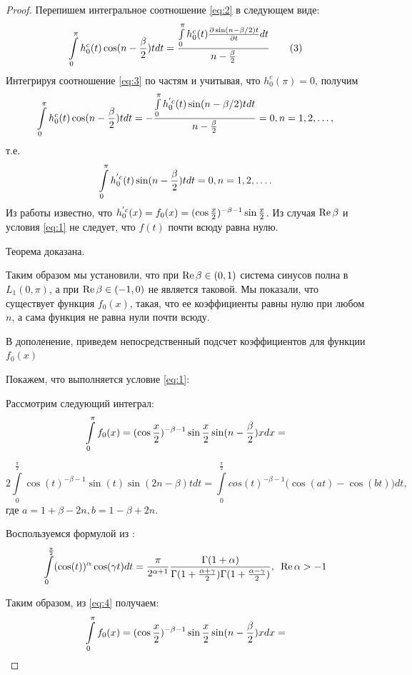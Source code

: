 ﻿\documentclass[oneside, final, 14pt]{extreport}
\begin{document}
\begin{proof}
		Перепишем интегральное соотношение \eqref{eq:2} в следующем виде:
		\begin{equation}
			\int\limits_0^\pi h^c_0(t)\cos(n - \frac{\beta}{2})tdt = 
			\frac{\int\limits_0^\pi h^c_0(t)\frac{\partial\sin(n - \beta / 2)t}{\partial t}dt}{n - \frac{\beta}{2}}
			\tag{3}\label{eq:3}
		\end{equation}
		Интегрируя соотношение \eqref{eq:3} по частям и учитывая, что $h^c_0(\pi) = 0$, получим
		$$
			\int\limits_0^\pi h^c_0(t)\cos(n - \frac{\beta}{2})tdt = 
			-\frac{\int\limits_0^\pi h^{'c}_0(t)\sin(n - \beta / 2)tdt}{n - \frac{\beta}{2}} = 0, n = 1,2, \ldots,
		$$
		т.е.
		$$
			\int\limits_0^\pi h^{'c}_0(t)\sin(n - \frac{\beta}{2})tdt = 0, n = 1, 2, \ldots.
		$$
		Из работы \cite{moiseev-2018} известно, что $h^{'c}_0(x) = f_0(x) = (\cos\frac{x}{2})^{-\beta-1}\sin\frac{x}{2}$.
		Из случая $\operatorname{Re}{\beta}$ и условия \eqref{eq:1} не следует, что $f(t)$ почти всюду равна нулю.
		
		Теорема доказана.
		
		\bigskip
		Таким образом мы установили, что при $\operatorname{Re}{\beta} \in (0, 1)$ система синусов полна в $L_1(0, \pi)$, а при 
		$\operatorname{Re}{\beta} \in (-1, 0)$ не является таковой. Мы показали, что существует функция $f_0(x)$, такая, что ее 
		коэффициенты равны нулю при любом $n$, а сама функция не равна нули почти всюду.
		
		В дополенение, приведем непосредственный подсчет коэффициентов для функции $f_0(x)$
		
		Покажем, что выполняется условие \eqref{eq:1}:
		
		 Рассмотрим следующий интеграл:
		$$
			\int\limits_0^\pi f_0(x) = (\cos\frac{x}{2})^{-\beta-1}\sin\frac{x}{2}\sin(n - \frac{\beta}{2})xdx = 
		$$
		
		\begin{equation}
			2\int\limits_0^\frac{\pi}{2}\cos(t)^{-\beta - 1}\sin(t)\sin(2n - \beta)tdt 
			= \int\limits_0^\frac{\pi}{2}cos(t)^{-\beta-1}\bigl(\cos(at) - \cos(bt)\bigr)dt,	\tag{4} \label{eq:4}
		\end{equation}
		где $a =1 + \beta - 2n, b = 1 - \beta + 2n.$
		
		
		
		\bigskip
		
		Воспользуемся формулой из \cite{bateman}:
		$$
			\int\limits_0^\frac{\pi}{2}(\cos(t))^\alpha \cos(\gamma t)dt = \frac{\pi}{2^{\alpha + 1}}
			\frac{\Gamma(1 + \alpha)}{\Gamma(1 + \frac{\alpha + \gamma}{2})\Gamma(1 + \frac{\alpha - \gamma}{2})},
			\enspace\operatorname{Re}\alpha > -1
		$$
		
		Таким образом, из \eqref{eq:4} получаем:
		$$
			\int\limits_0^\pi f_0(x) = (\cos\frac{x}{2})^{-\beta-1}\sin\frac{x}{2}\sin(n - \frac{\beta}{2})xdx = 
		$$
		

\end{proof}
\end{document}
